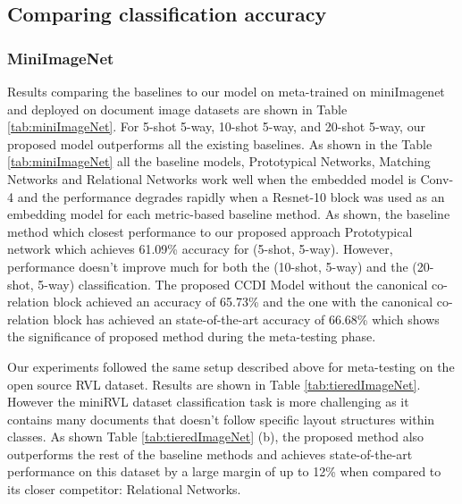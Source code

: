 \subsection{Comparing classification accuracy} 
\subsubsection{MiniImageNet}
Results comparing the baselines to our model on meta-trained on miniImagenet and deployed on document image datasets are shown in Table \ref{tab:miniImageNet}. For 5-shot 5-way, 10-shot 5-way, and 20-shot 5-way, our proposed model outperforms all the existing baselines. As shown in the Table \ref{tab:miniImageNet} all the baseline models, Prototypical Networks, Matching Networks and Relational Networks work well when the embedded model is Conv-4 and the performance degrades rapidly when a Resnet-10 block was used as an embedding model for each metric-based baseline method. As shown, the baseline method which closest performance to our proposed approach Prototypical network which achieves 61.09\% accuracy for (5-shot, 5-way). However, performance doesn't improve much for both the (10-shot, 5-way) and the (20-shot, 5-way) classification. The proposed CCDI Model without the canonical co-relation block achieved an accuracy of 65.73\% and the one with the canonical co-relation block has achieved an state-of-the-art accuracy of 66.68\%  which shows the significance of proposed method during the meta-testing phase.

Our experiments followed the same setup described above for meta-testing on the open source RVL dataset. Results are shown in Table \ref{tab:tieredImageNet}. However the miniRVL dataset classification task is more challenging as it contains many documents that doesn't follow specific layout structures within classes. 
As shown Table \ref{tab:tieredImageNet} (b),  the proposed method also outperforms the rest of the baseline methods and achieves state-of-the-art performance on this dataset by a large margin of up to 12\% when compared to its closer competitor: Relational Networks. %

